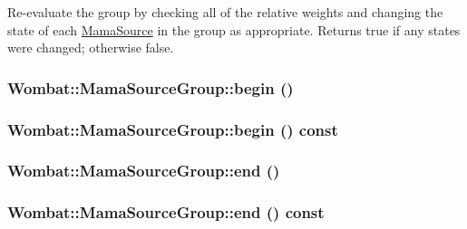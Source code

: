 Re-\/evaluate the group by checking all of the relative weights and changing the state of each \hyperlink{classWombat_1_1MamaSource}{MamaSource} in the group as appropriate. Returns true if any states were changed; otherwise false. \hypertarget{classWombat_1_1MamaSourceGroup_a28f48b4318790e7d87ac3bb229eee94b}{
\subsubsection[{begin}]{ Wombat::MamaSourceGroup::begin ()}}
\label{classWombat_1_1MamaSourceGroup_a28f48b4318790e7d87ac3bb229eee94b}
\hypertarget{classWombat_1_1MamaSourceGroup_a5b81ba4ad763351009a7e434e95fb295}{
\subsubsection[{begin}]{ Wombat::MamaSourceGroup::begin () const}}
\label{classWombat_1_1MamaSourceGroup_a5b81ba4ad763351009a7e434e95fb295}
\hypertarget{classWombat_1_1MamaSourceGroup_a29a6d7226dea7635aa9f168a79f7ed9d}{
\subsubsection[{end}]{ Wombat::MamaSourceGroup::end ()}}
\label{classWombat_1_1MamaSourceGroup_a29a6d7226dea7635aa9f168a79f7ed9d}
\hypertarget{classWombat_1_1MamaSourceGroup_a5198459780dfbfda88c97a244df89755}{
\subsubsection[{end}]{ Wombat::MamaSourceGroup::end () const}}
\label{classWombat_1_1MamaSourceGroup_a5198459780dfbfda88c97a244df89755}
